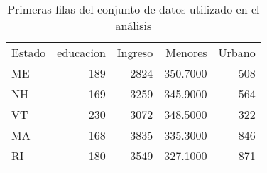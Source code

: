 \begin{table}[H]
    \centering
    \color{blue}
    \caption{Primeras filas del conjunto de datos utilizado en el análisis}
    \label{tab:head_datos}
    \begin{tabular}{lrrrr}
        
        Estado & educacion & Ingreso & Menores & Urbano \\
        
        ME & 189 & 2824 & 350.7000 & 508 \\
        NH & 169 & 3259 & 345.9000 & 564 \\
        VT & 230 & 3072 & 348.5000 & 322 \\
        MA & 168 & 3835 & 335.3000 & 846 \\
        RI & 180 & 3549 & 327.1000 & 871 \\
        
    \end{tabular}
\end{table}
